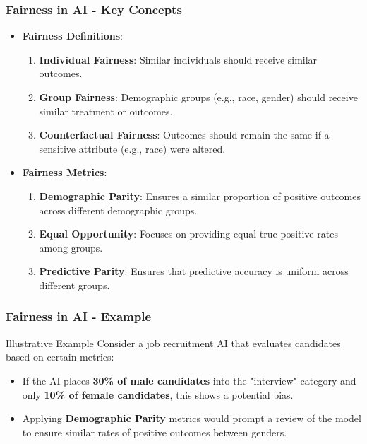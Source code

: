 \documentclass{beamer}
\begin{document}
\begin{frame}[fragile]
    \frametitle{Fairness in AI - Key Concepts}
    \begin{itemize}
        \item \textbf{Fairness Definitions}:
        \begin{enumerate}
            \item \textbf{Individual Fairness}: Similar individuals should receive similar outcomes.
            \item \textbf{Group Fairness}: Demographic groups (e.g., race, gender) should receive similar treatment or outcomes.
            \item \textbf{Counterfactual Fairness}: Outcomes should remain the same if a sensitive attribute (e.g., race) were altered.
        \end{enumerate}
        
        \item \textbf{Fairness Metrics}:
        \begin{enumerate}
            \item \textbf{Demographic Parity}: Ensures a similar proportion of positive outcomes across different demographic groups.
            \item \textbf{Equal Opportunity}: Focuses on providing equal true positive rates among groups.
            \item \textbf{Predictive Parity}: Ensures that predictive accuracy is uniform across different groups.
        \end{enumerate}
    \end{itemize}
\end{frame}

\begin{frame}[fragile]
    \frametitle{Fairness in AI - Example}
    \begin{block}{Illustrative Example}
        Consider a job recruitment AI that evaluates candidates based on certain metrics:
        \begin{itemize}
            \item If the AI places \textbf{30\% of male candidates} into the "interview" category and only \textbf{10\% of female candidates}, this shows a potential bias. 
            \item Applying \textbf{Demographic Parity} metrics would prompt a review of the model to ensure similar rates of positive outcomes between genders.
        \end{itemize}
    \end{block}
\end{frame}
\end{document}
